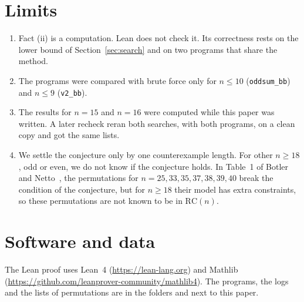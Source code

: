 \documentclass[11pt]{article}
\theoremstyle{remark}
\newcommand{\RC}{\mathrm{RC}}
\begin{document}
\section{Limits}

\begin{enumerate}
\item Fact (ii) is a computation. Lean does not check it. Its correctness rests on the lower bound of Section~\ref{sec:search} and on two programs that share the method.
\item The programs were compared with brute force only for $n \le 10$ (\texttt{oddsum\_bb}) and $n \le 9$ (\texttt{v2\_bb}).
\item The results for $n = 15$ and $n = 16$ were computed while this paper was written. A later recheck reran both searches, with both programs, on a clean copy and got the same lists.
\item We settle the conjecture only by one counterexample length. For other $n \ge 18$, odd or even, we do not know if the conjecture holds. In Table~1 of Botler and Netto~\cite{BN}, the permutations for $n = 25, 33, 35, 37, 38, 39, 40$ break the condition of the conjecture, but for $n \ge 18$ their model has extra constraints, so these permutations are not known to be in $\RC(n)$.
\end{enumerate}

\section*{Software and data}
The Lean proof uses Lean~4 (\url{https://lean-lang.org}) and Mathlib (\url{https://github.com/leanprover-community/mathlib4}). The programs, the logs and the lists of permutations are in the folders  and  next to this paper.
\end{document}
